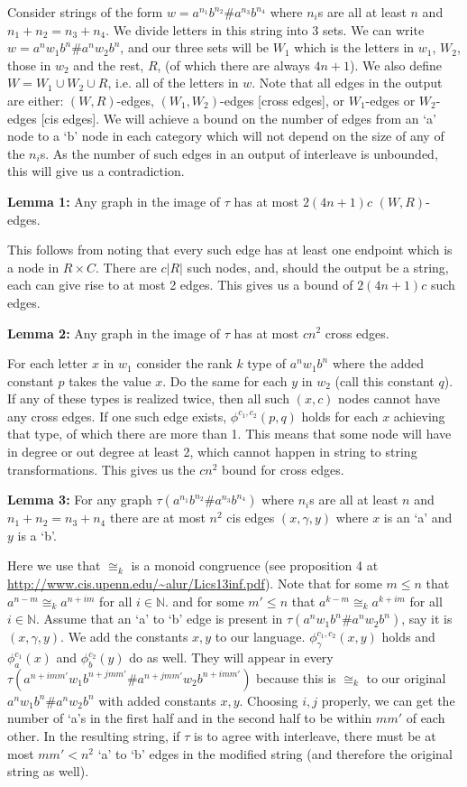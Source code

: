 \documentclass[10pt]{IEEEtran}%
\newcommand{\N}{\mathbb{N}}
\begin{document}
Consider strings of the form $w = a^{n_1}b^{n_2}\#a^{n_3}b^{n_4}$ where $n_i$s are all at least $n$ and $n_1 + n_2 = n_3 + n_4$. We divide letters in this string into 3 sets. We can write $w = a^{n}w_1b^{n}\#a^{n}w_2b^{n}$, and our three sets will be $W_1$ which is the letters in $w_1$, $W_2$, those in $w_2$ and the rest, $R$, (of which there are always $4n+1$). We also define $W = W_1 \cup W_2 \cup R$, i.e. all of the letters in $w$. Note that all edges in the output are either: $(W, R)$-edges, $(W_1, W_2)$-edges [cross edges], or $W_1$-edges or $W_2$-edges [cis edges]. We will achieve a bound on the number of edges from an `a' node to a `b' node in each category which will not depend on the size of any of the $n_i$s. As the number of such edges in an output of interleave is unbounded, this will give us a contradiction. 

\textbf{Lemma 1:} Any graph in the image of $\tau$ has at most $2(4n +1)c$ $(W, R)$-edges. 

This follows from noting that every such edge has at least one endpoint which is a node in $R \times C$. There are $c|R|$ such nodes, and, should the output be a string, each can give rise to at most 2 edges. This gives us a bound of $2(4n +1)c$ such edges. 

\textbf{Lemma 2:} Any graph in the image of $\tau$ has at most $cn^2$ cross edges. 

For each letter $x$ in $w_1$ consider the rank $k$ type of $a^{n}w_1b^{n}$ where the added constant $p$ takes the value $x$. Do the same for each $y$ in $w_2$ (call this constant $q$). If any of these types is realized twice, then all such $(x, c)$ nodes cannot have any cross edges. If one such edge exists, $\phi^{c_1, c_2}(p, q)$ holds for each $x$ achieving that type, of which there are more than 1. This means that some node will have in degree or out degree at least 2, which cannot happen in string to string transformations. This gives us the $cn^2$ bound for cross edges.  

\textbf{Lemma 3:} For any graph $\tau(a^{n_1}b^{n_2}\#a^{n_3}b^{n_4})$ where $n_i$s are all at least $n$ and $n_1 + n_2 = n_3 + n_4$ there are at most $n^2$ cis edges $(x, \gamma, y)$ where $x$ is an `a' and $y$ is a `b'.

Here we use that $\cong_k$ is a monoid congruence (see proposition 4 at \url{http://www.cis.upenn.edu/~alur/Lics13inf.pdf}). Note that for some $m \leq n$ that $a^{n-m}\cong_k a^{n+im}$ for all $i \in \N$. and for some $m' \leq n$ that $a^{k-m}\cong_k a^{k+im}$ for all $i \in \N$. Assume that an `a' to `b' edge is present in $\tau(a^{n}w_1b^{n}\#a^{n}w_2b^{n})$, say it is $(x, \gamma, y)$. We add the constants $x, y$ to our language. $\phi_\gamma^{c_1, c_2}(x, y)$ holds and $\phi_a^{c_1}(x)$ and $\phi_b^{c_2}(y)$ do as well. They will appear in every $\tau(a^{n + imm'}w_1b^{n+jmm'}\#a^{n+jmm'}w_2b^{n + imm'})$ because this is $\cong_k$ to our original $a^{n}w_1b^{n}\#a^{n}w_2b^{n}$ with added constants $x, y$. Choosing $i, j$ properly, we can get the number of `a's in the first half and in the second half to be within $mm'$ of each other. In the resulting string, if $\tau$ is to agree with interleave, there must be at most $mm' < n^2$ `a' to `b' edges in the modified string (and therefore the original string as well). 
\end{document}
